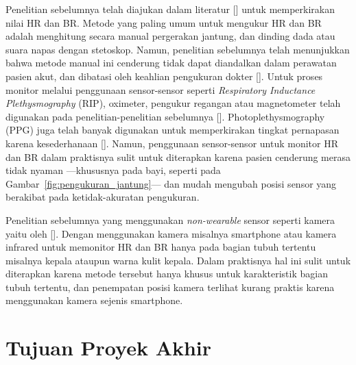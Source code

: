 Penelitian sebelumnya telah diajukan dalam literatur [\citet{kristjansdottir2004,leonard2006,nilsson2000,nam2014,tarrant1997}] untuk memperkirakan nilai HR dan BR. Metode yang paling umum untuk mengukur HR dan BR adalah menghitung secara manual pergerakan jantung, dan dinding dada atau suara napas dengan stetoskop. Namun, penelitian sebelumnya telah menunjukkan bahwa metode manual ini cenderung tidak dapat diandalkan dalam perawatan pasien akut, dan dibatasi oleh keahlian pengukuran dokter [\citet{hillman2005}]. Untuk proses monitor melalui penggunaan sensor-sensor seperti \textit{Respiratory Inductance Plethysmography} (RIP), oximeter, pengukur regangan atau magnetometer telah digunakan pada penelitian-penelitian sebelumnya  [\citet{Mendelson2006,Renevey2001,tarrant1997,Yang1998}]. Photoplethysmography (PPG) juga telah banyak digunakan untuk memperkirakan tingkat pernapasan karena kesederhanaan [\citet{Allen2007,Kamal1989,kristjansdottir2004}]. Namun, penggunaan sensor-sensor untuk monitor HR dan BR dalam praktisnya sulit untuk diterapkan karena pasien cenderung merasa tidak nyaman ---khususnya pada bayi, seperti pada Gambar~\ref{fig:pengukuran_jantung}--- dan mudah mengubah posisi sensor yang berakibat pada ketidak-akuratan pengukuran.

Penelitian sebelumnya yang menggunakan \textit{non-wearable} sensor seperti kamera yaitu oleh [\citet{lazaro2014,nam2014}]. Dengan menggunakan kamera misalnya smartphone atau kamera infrared untuk memonitor HR dan BR hanya pada bagian tubuh tertentu misalnya kepala ataupun warna kulit kepala. Dalam praktisnya hal ini sulit untuk diterapkan karena metode tersebut hanya khusus untuk karakteristik bagian tubuh tertentu, dan penempatan posisi kamera terlihat kurang praktis karena menggunakan kamera sejenis smartphone.
                                          
\section{Tujuan Proyek Akhir} %

